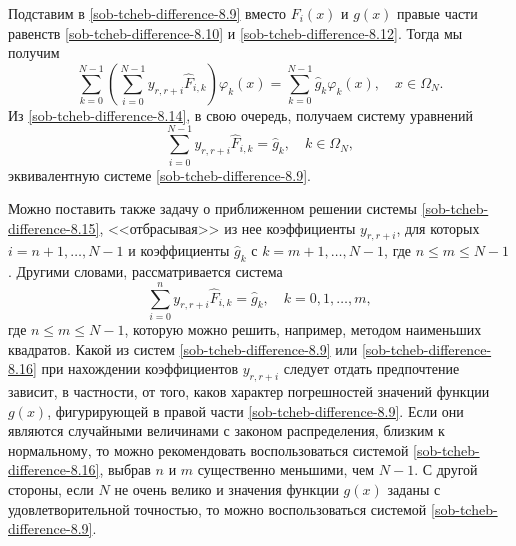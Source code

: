 Подставим в \eqref{sob-tcheb-difference-8.9} вместо $F_{i}(x)$ и $g(x)$ правые части равенств \eqref{sob-tcheb-difference-8.10} и \eqref{sob-tcheb-difference-8.12}. Тогда мы получим
\begin{equation}\label{sob-tcheb-difference-8.14}
 \sum_{k=0}^{N-1}\left(\sum_{i=0}^{N-1} y_{r,r+i}\hat F_{i,k}\right)\varphi_k(x)=\sum_{k=0}^{N-1}\hat g_{k}\varphi_k(x), \quad x\in \Omega_N.
  \end{equation}
Из \eqref{sob-tcheb-difference-8.14}, в свою очередь, получаем систему уравнений
\begin{equation}\label{sob-tcheb-difference-8.15}
 \sum_{i=0}^{N-1} y_{r,r+i}\hat F_{i,k}=\hat g_{k}, \quad k\in \Omega_N,
  \end{equation}
эквивалентную системе \eqref{sob-tcheb-difference-8.9}.

 Можно поставить также задачу о приближенном решении системы \eqref{sob-tcheb-difference-8.15}, <<отбрасывая>>
 из нее коэффициенты $y_{r,r+i}$, для которых $i=n+1,\ldots, N-1$ и коэффициенты
 $\hat g_{k}$ с $k=m+1,\ldots, N-1$, где $n\le m\le N-1$. Другими словами, рассматривается  система
 \begin{equation}\label{sob-tcheb-difference-8.16}
 \sum_{i=0}^n y_{r,r+i}\hat F_{i,k}=\hat g_{k}, \quad k=0,1,\ldots, m,
   \end{equation}
 где $n\le m\le N-1$, которую можно решить, например, методом наименьших квадратов.
 Какой из систем \eqref{sob-tcheb-difference-8.9} или \eqref{sob-tcheb-difference-8.16} при нахождении коэффициентов $y_{r,r+i}$ следует отдать предпочтение зависит, в частности, от того, каков характер погрешностей  значений функции $g(x)$, фигурирующей в правой части \eqref{sob-tcheb-difference-8.9}. Если они являются случайными величинами с законом распределения, близким к нормальному, то можно рекомендовать воспользоваться системой \eqref{sob-tcheb-difference-8.16}, выбрав $n$ и $m$ существенно меньшими, чем $N-1$. С другой стороны, если $N$ не очень велико и значения функции $g(x)$ заданы с удовлетворительной точностью, то можно воспользоваться системой \eqref{sob-tcheb-difference-8.9}.
